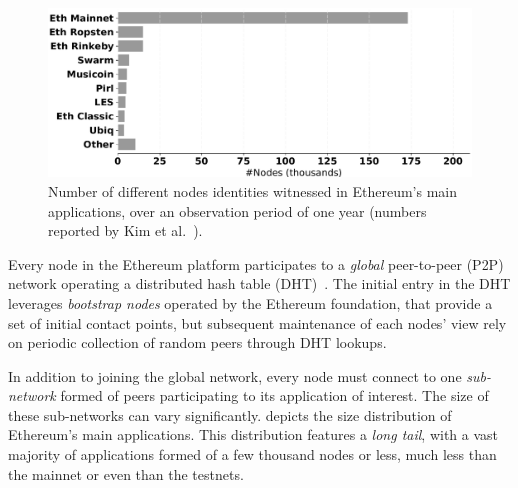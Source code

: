 \begin{figure}[t]
    \includegraphics[width=1\linewidth]{img/ecosystem}
    \caption{Number of different nodes identities witnessed in Ethereum's main applications, over an observation period of one year \protect{} (numbers reported by Kim et al.~\cite{kim2018measuring}).
    \protect{}
    \protect{}
    }
    \label{fig:ecosystem}
\end{figure}

Every node in the Ethereum platform participates to a \emph{global} peer-to-peer (P2P) network operating a distributed hash table (DHT)~\cite{maymounkov2002kademlia}. 
The initial entry in the DHT leverages \emph{bootstrap nodes} operated by the Ethereum foundation, that provide a set of initial contact points, but subsequent maintenance of each nodes' view rely on periodic collection of random peers through DHT lookups.

In addition to joining the global network, every node must connect to one \emph{sub-network} formed of peers participating to its application of interest.
The size of these sub-networks can vary significantly.
 depicts the size distribution of Ethereum's main applications.
This distribution features a \emph{long tail}, with a vast majority of applications formed of a few thousand nodes or less, much less than the mainnet or even than the testnets. 

